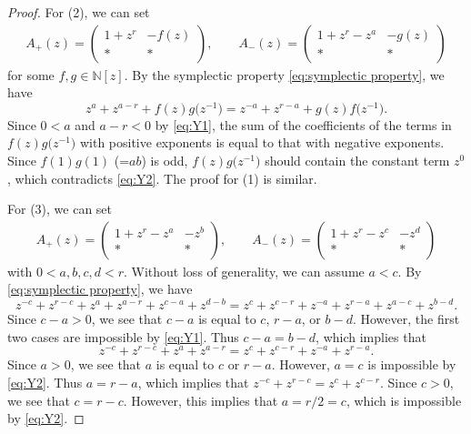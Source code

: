 \documentclass[10pt,a4paper]{amsart}
\begin{document}
\begin{proof}
 For (2), we can set
 \begin{align*}
 A_+(z) =
 \begin{pmatrix}
 1 + z^r & -f(z) \\
 * & *
 \end{pmatrix},\qquad
 A_-(z) =
 \begin{pmatrix}
 1 + z^r - z^a & -g(z) \\
 * & *
 \end{pmatrix}
 \end{align*}
 for some $f, g \in \mathbb{N}[z]$.
 By the symplectic property \eqref{eq:symplectic property}, we have
 \[
 z^a + z^{a - r} + f(z) g\bigl(z^{-1}\bigr) =
 z^{-a} + z^{r-a} + g(z) f\bigl(z^{-1}\bigr).
 \]
 Since $0 < a$ and $a-r<0$ by \eqref{eq:Y1},
 the sum of the coefficients of the terms in $f(z)g\bigl(z^{-1}\bigr)$ with positive exponents
 is equal to that with negative exponents.
 Since $f(1) g(1)$ (=$ab$) is odd, $f(z) g\bigl(z^{-1}\bigr)$ should contain the constant term $z^0$,
 which contradicts \eqref{eq:Y2}.
 The proof for (1) is similar.

 For (3), we can set
 \begin{align*}
 A_+(z) =
 \begin{pmatrix}
 1 + z^r - z^a & -z^b \\
 * & *
 \end{pmatrix},\qquad
 A_-(z) =
 \begin{pmatrix}
 1 + z^r - z^c & -z^d \\
 * & *
 \end{pmatrix}
 \end{align*}
 with $0< a,b,c,d < r$.
 Without loss of generality, we can assume $a<c$.
 By \eqref{eq:symplectic property}, we have
 \begin{equation*}
 z^{-c} + z^{r-c} + z^a + z^{a-r} + z^{c-a} + z^{d-b}
 = z^{c} + z^{c-r} + z^{-a} + z^{r-a} + z^{a-c} + z^{b-d}.
 \end{equation*}
 Since $c - a > 0$, we see that $c - a$ is equal to $c$, $r-a$, or $b-d$.
 However, the first two cases are impossible by \eqref{eq:Y1}.
 Thus $c - a = b - d$, which implies that
 \begin{equation*}
 z^{-c} + z^{r-c} + z^a + z^{a-r}
 = z^{c} + z^{c-r} + z^{-a} + z^{r-a}.
 \end{equation*}
 Since $a > 0$, we see that $a$ is equal to $c$ or $r-a$.
 However, $a = c$ is impossible by \eqref{eq:Y2}.
 Thus $a = r-a$, which implies that
$
 z^{-c} + z^{r-c}
 = z^{c} + z^{c-r}$.
 Since $c > 0$, we see that $c = r -c$.
 However, this implies that $a = r/2 = c$, which is impossible by \eqref{eq:Y2}.


\end{proof}
\end{document}
